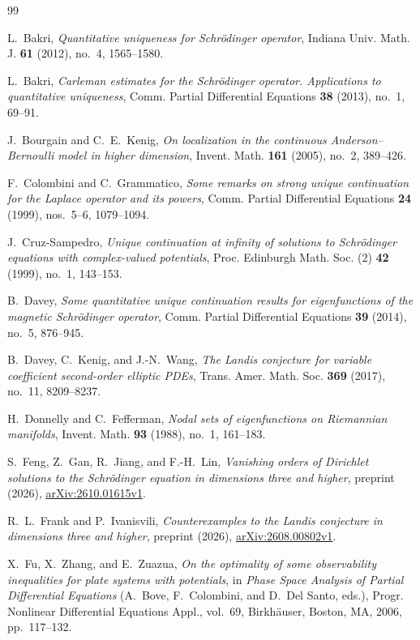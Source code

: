 \documentclass[11pt,a4paper,leqno]{amsart}
\numberwithin{equation}{section}
\theoremstyle{landisplain}
\theoremstyle{landisdefinition}
\theoremstyle{landisremark}
\begin{document}
\begin{thebibliography}{99}

L.~Bakri,
\emph{Quantitative uniqueness for Schr\"odinger operator},
Indiana Univ. Math. J. \textbf{61} (2012), no.~4, 1565--1580.

L.~Bakri,
\emph{Carleman estimates for the Schr\"odinger operator.
Applications to quantitative uniqueness},
Comm. Partial Differential Equations \textbf{38} (2013), no.~1, 69--91.

J.~Bourgain and C.~E.~Kenig,
\emph{On localization in the continuous Anderson--Bernoulli model
in higher dimension},
Invent. Math. \textbf{161} (2005), no.~2, 389--426.

F.~Colombini and C.~Grammatico,
\emph{Some remarks on strong unique continuation for the Laplace
operator and its powers},
Comm. Partial Differential Equations \textbf{24} (1999), nos.~5--6,
1079--1094.

J.~Cruz-Sampedro,
\emph{Unique continuation at infinity of solutions to Schr\"odinger
equations with complex-valued potentials},
Proc. Edinburgh Math. Soc. (2) \textbf{42} (1999), no.~1, 143--153.

B.~Davey,
\emph{Some quantitative unique continuation results for
eigenfunctions of the magnetic Schr\"odinger operator},
Comm. Partial Differential Equations \textbf{39} (2014), no.~5,
876--945.

B.~Davey, C.~Kenig, and J.-N.~Wang,
\emph{The Landis conjecture for variable coefficient second-order
elliptic PDEs},
Trans. Amer. Math. Soc. \textbf{369} (2017), no.~11, 8209--8237.

H.~Donnelly and C.~Fefferman,
\emph{Nodal sets of eigenfunctions on Riemannian manifolds},
Invent. Math. \textbf{93} (1988), no.~1, 161--183.

S.~Feng, Z.~Gan, R.~Jiang, and F.-H.~Lin,
\emph{Vanishing orders of Dirichlet solutions to the Schr\"odinger
equation in dimensions three and higher},
preprint (2026),
\href{https://arxiv.org/abs/2610.01615v1}{arXiv:2610.01615v1}.

R.~L.~Frank and P.~Ivanisvili,
\emph{Counterexamples to the Landis conjecture in dimensions three
and higher},
preprint (2026),
\href{https://arxiv.org/abs/2608.00802v1}{arXiv:2608.00802v1}.

X.~Fu, X.~Zhang, and E.~Zuazua,
\emph{On the optimality of some observability inequalities for plate
systems with potentials}, in \emph{Phase Space Analysis of Partial
Differential Equations} (A.~Bove, F.~Colombini, and D.~Del Santo, eds.),
Progr. Nonlinear Differential Equations Appl., vol.~69,
Birkh\"auser, Boston, MA, 2006, pp.~117--132.


\end{thebibliography}
\end{document}
